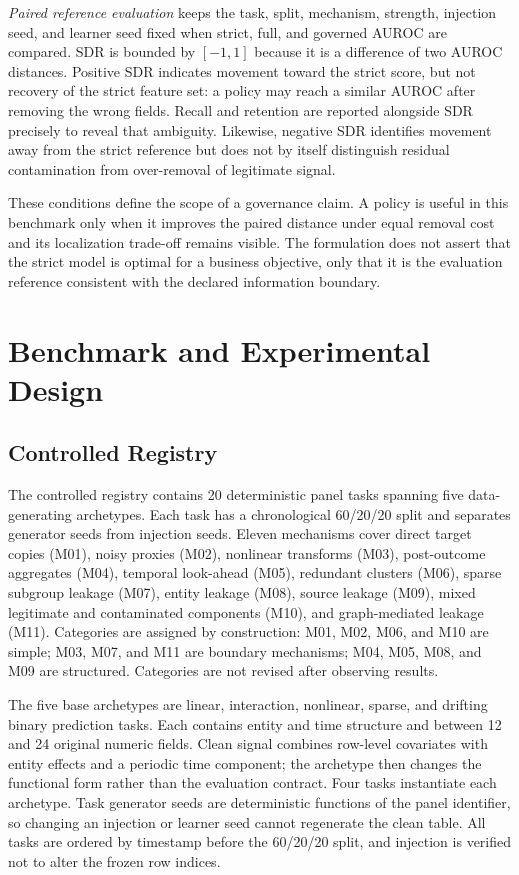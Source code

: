 \documentclass[sigconf,review]{acmart}
\begin{document}
\textit{Paired reference evaluation} keeps the task, split, mechanism,
strength, injection seed, and learner seed fixed when strict, full, and
governed AUROC are compared. SDR is bounded by $[-1,1]$ because it is a
difference of two AUROC distances. Positive SDR indicates movement toward the
strict score, but not recovery of the strict feature set: a policy may reach a
similar AUROC after removing the wrong fields. Recall and retention are
reported alongside SDR precisely to reveal that ambiguity. Likewise, negative
SDR identifies movement away from the strict reference but does not by itself
distinguish residual contamination from over-removal of legitimate signal.

These conditions define the scope of a governance claim. A policy is useful in
this benchmark only when it improves the paired distance under equal removal
cost and its localization trade-off remains visible. The formulation does not
assert that the strict model is optimal for a business objective, only that it
is the evaluation reference consistent with the declared information
boundary.

\section{Benchmark and Experimental Design}

\subsection{Controlled Registry}

The controlled registry contains 20 deterministic panel tasks spanning five
data-generating archetypes. Each task has a chronological 60/20/20 split and
separates generator seeds from injection seeds. Eleven mechanisms cover direct
target copies (M01), noisy proxies (M02), nonlinear transforms (M03),
post-outcome aggregates (M04), temporal look-ahead (M05), redundant clusters
(M06), sparse subgroup leakage (M07), entity leakage (M08), source leakage
(M09), mixed legitimate and contaminated components (M10), and graph-mediated
leakage (M11). Categories are assigned by construction: M01, M02, M06, and M10
are simple; M03, M07, and M11 are boundary mechanisms; M04, M05, M08, and M09
are structured. Categories are not revised after observing results.

The five base archetypes are linear, interaction, nonlinear, sparse, and
drifting binary prediction tasks. Each contains entity and time structure and
between 12 and 24 original numeric fields. Clean signal combines row-level
covariates with entity effects and a periodic time component; the archetype
then changes the functional form rather than the evaluation contract. Four
tasks instantiate each archetype. Task generator seeds are deterministic
functions of the panel identifier, so changing an injection or learner seed
cannot regenerate the clean table. All tasks are ordered by timestamp before
the 60/20/20 split, and injection is verified not to alter the frozen row
indices.
\end{document}
